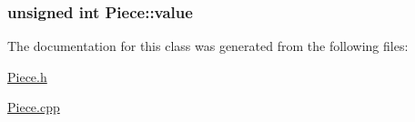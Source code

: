 \subsubsection[{\texorpdfstring{value}{value}}]{\setlength{\rightskip}{0pt plus 5cm}unsigned int Piece\+::value\hspace{0.3cm}{\ttfamily [protected]}}\hypertarget{class_piece_a8933ca826f6c9b958f781eaa0160c2b7}{}\label{class_piece_a8933ca826f6c9b958f781eaa0160c2b7}


The documentation for this class was generated from the following files\+:\begin{DoxyCompactItemize}
\item 
\hyperlink{_piece_8h}{Piece.\+h}\item 
\hyperlink{_piece_8cpp}{Piece.\+cpp}\end{DoxyCompactItemize}
